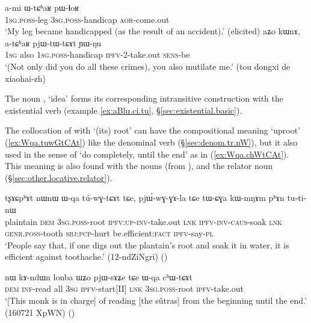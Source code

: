 \begin{exe}
\ex 
\begin{xlist}
\ex \label{ex:WtChaR.pWlhoR}
\gll a-mi ɯ-tɕʰaʁ pɯ-ɬoʁ \\
\textsc{1sg}.\textsc{poss}-leg \textsc{3sg}.\textsc{poss}-handicap \textsc{aor}-come.out \\
\glt `My leg became handicapped (as the result of an accident).' (elicited)
\ex \label{ex:atChaR.pjWtWtCAt}
\gll aʑo kɯnɤ, a-tɕʰaʁ pjɯ-tɯ-tɕɤt ɲɯ-ŋu \\
\textsc{1sg} also \textsc{1sg}.\textsc{poss}-handicap \textsc{ipfv}-2-take.out \textsc{sens}-be \\
\glt `(Not only did you do all these crimes), you also mutilate me.' (tou dongxi de xiaohai-zh)
\end{xlist}
\end{exe}

The noun , `idea' forms its corresponding intransitive construction with the existential verb  (example \ref{ex:aBlu.ci.tu}, §\ref{sec:existential.basic}).

The collocation of  with  `(its) root' can have the compositional meaning `uproot' (\ref{ex:Wqa.tuwGtCAt}) like the denominal verb (§\ref{sec:denom.tr.nW}), but it also used in the sense of `do completely, until the end' as in (\ref{ex:Wqa.chWtCAt}). This meaning is also found with the nouns  (from ),  and the relator noun  (§\ref{sec:other.locative.relator}).

\begin{exe}
\ex \label{ex:Wqa.tuwGtCAt}
\gll tʂɤɕpʰɤt nɯnɯ ɯ-qa tú-wɣ-tɕɤt tɕe, pjɯ́-wɣ-ɣɤ-la tɕe tɯ-ɕɣa kɯ-mŋɤm pʰɤn tu-ti-nɯ \\
plaintain \textsc{dem} \textsc{3sg}.\textsc{poss}-root \textsc{ipfv}:\textsc{up}-\textsc{inv}-take.out \textsc{lnk} \textsc{ipfv}-\textsc{inv}-\textsc{caus}-soak \textsc{lnk} \textsc{genr}.\textsc{poss}-tooth \textsc{sbj}:\textsc{pcp}-hurt be.efficient:\textsc{fact} \textsc{ipfv}-say-\textsc{pl} \\
\glt `People say that, if one digs out the plantain's root and soak it in water, it is efficient against toothache.' (12-ndZiNgri)
()
\end{exe}


\begin{exe}
\ex \label{ex:Wqa.chWtCAt}
\gll nɯ kɤ-ndɯn lonba ɯʑo pjɯ-sɤʑe tɕe ɯ-qa cʰɯ-tɕɤt \\
\textsc{dem} \textsc{inf}-read all \textsc{3sg} \textsc{ipfv}-start[II] \textsc{lnk} \textsc{3sg}.\textsc{poss}-root \textsc{ipfv}-take.out \\
\glt `[This monk is in charge] of reading [the sûtras] from the beginning until the end.' (160721 XpWN)
()
\end{exe} 

